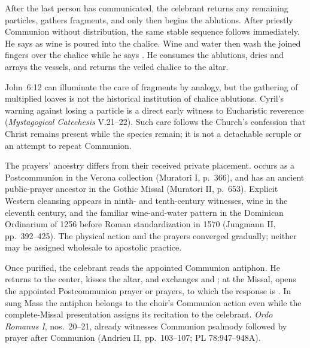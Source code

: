 
After the last person has communicated, the celebrant returns any remaining particles, gathers fragments, and only then begins the ablutions. After priestly Communion without distribution, the same stable sequence follows immediately. He says  as wine is poured into the chalice. Wine and water then wash the joined fingers over the chalice while he says . He consumes the ablutions, dries and arrays the vessels, and returns the veiled chalice to the altar.

John~6:12 can illuminate the care of fragments by analogy, but the gathering of multiplied loaves is not the historical institution of chalice ablutions. Cyril's warning against losing a particle is a direct early witness to Eucharistic reverence (\emph{Mystagogical Catechesis} V.21--22). Such care follows the Church's confession that Christ remains present while the species remain; it is not a detachable scruple or an attempt to repeat Communion.

The prayers' ancestry differs from their received private placement.  occurs as a Postcommunion in the Verona collection (Muratori I, p.~366), and  has an ancient public-prayer ancestor in the Gothic Missal (Muratori II, p.~653). Explicit Western cleansing appears in ninth- and tenth-century witnesses, wine in the eleventh century, and the familiar wine-and-water pattern in the Dominican Ordinarium of 1256 before Roman standardization in 1570 (Jungmann II, pp.~392--425). The physical action and the prayers converged gradually; neither may be assigned wholesale to apostolic practice.


Once purified, the celebrant reads the appointed Communion antiphon. He returns to the center, kisses the altar, and exchanges  and ; at the Missal,  opens the appointed Postcommunion prayer or prayers, to which the response is . In sung Mass the antiphon belongs to the choir's Communion action even while the complete-Missal presentation assigns its recitation to the celebrant. \emph{Ordo Romanus I}, nos.~20--21, already witnesses Communion psalmody followed by prayer after Communion (Andrieu II, pp.~103--107; PL 78:947--948A).


